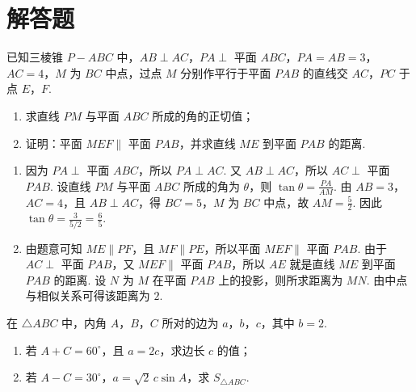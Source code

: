\section{解答题}

\begin{problem}
已知三棱锥 \(P-ABC\) 中，\(AB\perp AC\)，\(PA\perp\) 平面 \(ABC\)，\(PA=AB=3\)，\(AC=4\)，\(M\) 为 \(BC\) 中点，过点 \(M\) 分别作平行于平面 \(PAB\) 的直线交 \(AC\)，\(PC\) 于点 \(E\)，\(F\).

\begin{enumerate}
\item 求直线 \(PM\) 与平面 \(ABC\) 所成的角的正切值；
\item 证明：平面 \(MEF\parallel\) 平面 \(PAB\)，并求直线 \(ME\) 到平面 \(PAB\) 的距离.
\end{enumerate}

\end{problem}

\begin{solution}
\begin{enumerate}
\item 因为 \(PA\perp\) 平面 \(ABC\)，所以 \(PA\perp AC\). 又 \(AB\perp AC\)，所以 \(AC\perp\) 平面 \(PAB\). 设直线 \(PM\) 与平面 \(ABC\) 所成的角为 \(\theta\)，则 \(\tan\theta=\frac{PA}{AM}\). 由 \(AB=3\)，\(AC=4\)，且 \(AB\perp AC\)，得 \(BC=5\)，\(M\) 为 \(BC\) 中点，故 \(AM=\frac52\). 因此 \(\tan\theta=\frac{3}{5/2}=\frac65\).

\item 由题意可知 \(ME\parallel PF\)，且 \(MF\parallel PE\)，所以平面 \(MEF\parallel\) 平面 \(PAB\). 由于 \(AC\perp\) 平面 \(PAB\)，又 \(MEF\parallel\) 平面 \(PAB\)，所以 \(AE\) 就是直线 \(ME\) 到平面 \(PAB\) 的距离. 设 \(N\) 为 \(M\) 在平面 \(PAB\) 上的投影，则所求距离为 \(MN\). 由中点与相似关系可得该距离为 \(2\).
\end{enumerate}
\end{solution}

\begin{problem}
在 \(\triangle ABC\) 中，内角 \(A\)，\(B\)，\(C\) 所对的边为 \(a\)，\(b\)，\(c\)，其中 \(b=2\).

\begin{enumerate}
\item 若 \(A+C=60^\circ\)，且 \(a=2c\)，求边长 \(c\) 的值；
\item 若 \(A-C=30^\circ\)，\(a=\sqrt2\,c\sin A\)，求 \(S_{\triangle ABC}\).
\end{enumerate}
\end{problem}

